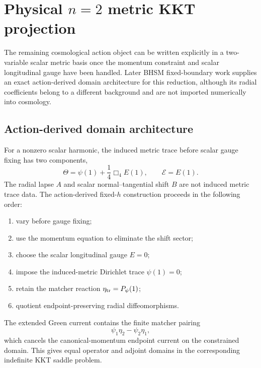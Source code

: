\section{Physical $n=2$ metric KKT projection}
\label{sec:bhsm-metric-kkt}

The remaining cosmological action object can be written explicitly in a
two-variable scalar metric basis once the momentum constraint and scalar
longitudinal gauge have been handled.  Later BHSM fixed-boundary work supplies
an exact action-derived domain architecture for this reduction, although its
radial coefficients belong to a different background and are not imported
numerically into cosmology.

\subsection{Action-derived domain architecture}

For a nonzero scalar harmonic, the induced metric trace before scalar gauge
fixing has two components,
\begin{equation}
\Theta
=
\psi(1)+\frac14\Box_4E(1),
\qquad
\mathcal E=E(1).
\end{equation}
The radial lapse $A$ and scalar normal--tangential shift $B$ are not induced
metric trace data.  The action-derived fixed-$h$ construction proceeds in the
following order:

\begin{enumerate}
\item vary before gauge fixing;
\item use the momentum equation to eliminate the shift sector;
\item choose the scalar longitudinal gauge $E=0$;
\item impose the induced-metric Dirichlet trace
      $\psi(1)=0$;
\item retain the matcher reaction
      $\eta_{\rm tr}=P_\psi(1)$;
\item quotient endpoint-preserving radial diffeomorphisms.
\end{enumerate}

The extended Green current contains the finite matcher pairing
\begin{equation}
\psi_1\eta_2-\psi_2\eta_1,
\end{equation}
which cancels the canonical-momentum endpoint current on the constrained
domain.  This gives equal operator and adjoint domains in the corresponding
indefinite KKT saddle problem.

